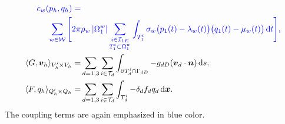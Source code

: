 {\begin{align*}
%
\color{blue}
 c_w(p_h,q_h) =& \\
 \color{blue}{ \sum_{w\in \mathcal{W}} \Bigg[2\pi}
        & \color{blue}{\rho_w\abs{\Omega^w_1} \sum_{\substack{i\in\mathcal{I}_{1E} \\ T^i_1\subset\Omega^w_1}}
        \int_{T^i_1} \sigma_w \big(p_1(t)-\lambda_w(t)\big) \big(q_1(t)-\mu_w(t)\big) \dd t} \Bigg],\\
 \langle G, \vc v_h\rangle_{V_h'\times V_h} =& \sum_{d=1,3}\sum_{i\in \mathcal T_d}
        \int_{\prtl T_d^i\cap \Gamma_{dD}}
                 - g_{dD} (\vc v_d \cdot \vc n) \dd s,\\
 \langle F, q_h\rangle_{Q_h'\times Q_h} =& \sum_{d=1,3}\sum_{i\in \mathcal T_d}%
        \int_{T_d^i} - \delta_d f_d q_d \dd\bx.
\end{align*}
}
The coupling terms are again emphasized in blue color.
